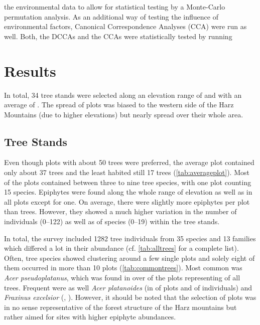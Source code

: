 \documentclass[12pt, a4paper, oneside, draft]{article}
\begin{document}
		the environmental data to allow for statistical testing by a Monte-Carlo permutation analysis. As an additional way of testing the influence of environmental factors, Canonical Correspondence Analyses (CCA) were run as well. Both, the DCCAs and the CCAs were statistically tested by running 
		

\section{Results}
In total, 34 tree stands were selected along an elevation range of  and with an average of . The spread of plots was biased to the western side of the Harz Mountains (due to higher elevations) but nearly spread over their whole area. 


	
	\subsection{Tree Stands}
	Even though plots with about 50 trees were preferred, the average plot contained only about 37 trees and the least habited still 17 trees (\autoref{tab:averageplot}). Most of the plots contained between three to nine tree species, with one plot counting 15 species. Epiphytes were found along the whole range of elevation as well as in all plots except for one. On average, there were slightly more epiphytes per plot than trees. However, they showed a much higher variation in the number of individuals (0--122) as well as of species (0--19) within the tree stands. 
	
	
	
	In total, the survey included 1282 tree individuals from 35 species and 13 families which differed a lot in their abundance (cf. \autoref{tab:alltrees} for a complete list).  Often, tree species showed clustering around a few single plots and solely eight of them occurred in more than 10 plots (\autoref{tab:commontrees}). Most common was \textit{Acer pseudoplatanus}, which was found in over  of the plots representing  of all trees. Frequent were as well \textit{Acer platanoides} (in  of plots and  of individuals) and \textit{Fraxinus excelsior} (, ). However, it should be noted that the selection of plots was in no sense representative of the forest structure of the Harz mountains but rather aimed for sites with higher epiphyte abundances.
	
\end{document}
